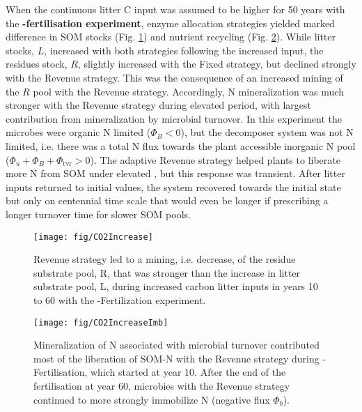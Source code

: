 When the continuous litter C input was assumed to be higher for 50 years with
the \textbf{-fertilisation experiment}, enzyme allocation strategies
yielded marked difference in SOM stocks (Fig. \ref{fig:CO2Increase}) and
nutrient recycling (Fig. \ref{fig:CO2IncreaseImb}).
While litter stocks, $L$, increased with both strategies following the increased
input, the residues stock, $R$, slightly increased with the Fixed strategy, but
declined strongly with the Revenue strategy. This was the consequence of an
increased mining of the $R$ pool with the Revenue strategy. Accordingly, N
mineralization was much stronger with the Revenue strategy during elevated
 period, with largest contribution from mineralization by microbial
turnover. In this experiment the microbes were organic N limited ($\Phi_B < 0$),
but the decomposer system was not N limited, i.e. there was a total N flux
towards the plant accessible inorganic N pool ($\Phi_u + \Phi_B +
\Phi_{\operatorname{tvr}} > 0$). The adaptive Revenue strategy helped plants to
liberate more N from SOM under elevated , but this response was
transient. After litter inputs returned to initial values, the system recovered
towards the initial state but only on centennial time scale that would even be
longer if prescribing a longer turnover time for slower SOM pools.

\begin{figure}[t] \vspace*{2mm}
\begin{center}
\texttt{[image: fig/CO2Increase]}
\end{center}
\caption{
Revenue strategy led to a mining, i.e. decrease, of the residue substrate pool,
R, that was stronger than the increase in litter substrate pool, L, during
increased carbon litter inputs in years 10 to 60 with the
-Fertilization experiment.
\label{fig:CO2Increase}}

\end{figure}
\begin{figure}[t] \vspace*{2mm}
\begin{center}
\texttt{[image: fig/CO2IncreaseImb]} 
\end{center}
\caption{
Mineralization of N associated with microbial turnover 
contributed most of the liberation of SOM-N with the Revenue strategy during
-Fertilisation, which started at year 10. 
After the end of the fertilisation at year 60, microbies with the Revenue
strategy continued to more strongly immobilize N (negative flux $\Phi_b$).
\label{fig:CO2IncreaseImb}}
\end{figure}

